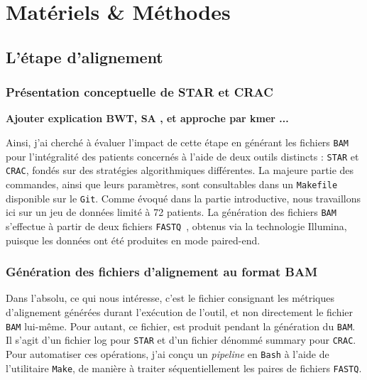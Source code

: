 \section{Matériels \& Méthodes}

\subsection{L'étape d'alignement}


\subsubsection{Présentation conceptuelle de STAR et CRAC}
\textbf{Ajouter explication BWT\textsuperscript{\cite{berard_bwt}}, SA \textsuperscript{\cite{berard_table_suffixes}}, et approche par kmer ...}


Ainsi, j'ai cherché à évaluer l'impact de cette étape en générant les fichiers \texttt{BAM} pour l'intégralité des patients concernés à l'aide de deux outils distincts : \texttt{STAR} et \texttt{CRAC}, fondés sur des stratégies algorithmiques différentes. La majeure partie des commandes, ainsi que leurs paramètres, sont consultables dans un \texttt{Makefile} disponible sur le \texttt{Git}. Comme évoqué dans la partie introductive, nous travaillons ici sur un jeu de données limité à 72 patients. La génération des fichiers \texttt{BAM}~\textsuperscript{\cite{illumina_bam_format}} s'effectue à partir de deux fichiers \texttt{FASTQ}~\textsuperscript{\cite{cock_fastq_2009}}, obtenus via la technologie Illumina\texttrademark, puisque les données ont été produites en mode \gls{paired-end}.

\subsubsection{Génération des fichiers d'alignement au format BAM}

Dans l'absolu, ce qui nous intéresse, c'est le fichier consignant les métriques d'alignement générées durant l'exécution de l'outil, et non directement le fichier \texttt{BAM} lui-même. Pour autant, ce fichier, est produit pendant la génération du \texttt{BAM}. Il s'agit d'un fichier \og log \fg{} pour \texttt{STAR} et d'un fichier dénommé \og summary \fg pour \texttt{CRAC}. Pour automatiser ces opérations, j'ai conçu un \textit{pipeline} en \texttt{Bash} à l'aide de l'utilitaire \texttt{Make}, de manière à traiter séquentiellement les paires de fichiers \texttt{FASTQ}.

